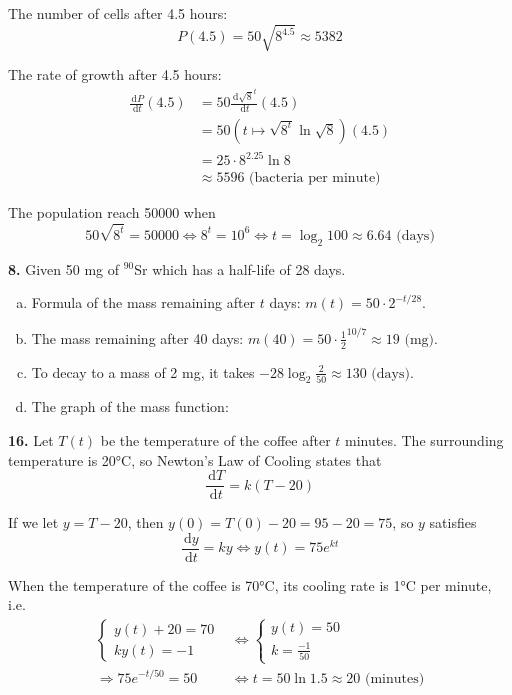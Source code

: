 \documentclass[a4paper,12pt]{article}
\newcommand{\ud}{\,\mathrm{d}}
\begin{document}
The number of cells after 4.5 hours:
\[P(4.5) = 50\sqrt{8^{4.5}} \approx 5382\tag{d}\]

The rate of growth after 4.5 hours:
\begin{align*}
   \frac{\ud P}{\ud t}(4.5)
&= 50\frac{\ud \sqrt{8}^t}{\ud t}(4.5)\\
&= 50\left(t \mapsto \sqrt{8^t}\ln\sqrt{8}\right)(4.5)\\
&= 25\cdot8^{2.25}\ln 8\\
&\approx 5596\text{ (bacteria per minute)}\tag{e}
\end{align*}

The population reach 50000 when
\[50\sqrt{8^t} = 50000 \iff 8^t = 10^6 \iff t = \log_2{100}
\approx 6.64\text{ (days)}\tag{f}\]

\noindent\textbf{8. }Given 50 mg of $^{90}$Sr which has a half-life of 28 days.
\begin{enumerate}[(a)]
  \item Formula of the mass remaining after $t$ days: $m(t) = 50\cdot2^{-t/28}$.
  \item The mass remaining after 40 days:
    $m(40) = 50\cdot\frac{1}{2}^{10/7} \approx 19\text{ (mg)}$.
  \item To decay to a mass of 2 mg, it takes
    $-28\log_2\frac{2}{50} \approx 130\text{ (days)}$.
  \item The graph of the mass function:\\
\end{enumerate}

\noindent\textbf{16. }Let $T(t)$ be the temperature of the coffee after $t$
minutes. The surrounding temperature is \ang{20}C, so Newton's Law of Cooling
states that \[\frac{\ud T}{\ud t} = k(T - 20)\]

If we let $y = T - 20$, then $y(0) = T(0) - 20 = 95 - 20 = 75$, so $y$
satisfies \[\frac{\ud y}{\ud t} = ky \iff y(t) = 75e^{kt}\]

When the temperature of the coffee is \ang{70}C, its cooling rate is \ang{1}C
per minute, i.e.
\begin{align*}
  \begin{cases}
    y(t) + 20 = 70\\
    ky(t) = -1
  \end{cases}
  &\iff\begin{cases}
         y(t) = 50\\
         k = \frac{-1}{50}
       \end{cases}\\
  \Longrightarrow 75e^{-t/50} = 50
    &\iff t = 50\ln1.5 \approx 20\text{ (minutes)}
\end{align*}
\end{document}
